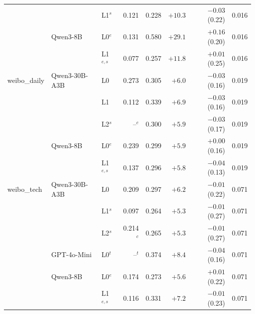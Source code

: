 \begin{table}[t]
\begin{tabular}{lllrrrrr}
 &  & L1$^{s}$ & 0.121 & 0.228 & $+10.3$ & $-0.03$ (0.22) & 0.016 \\
 & Qwen3-8B & L0$^{e}$ & 0.131 & 0.580 & $+29.1$ & $+0.16$ (0.20) & 0.016 \\
 &  & L1$^{e,s}$ & 0.077 & 0.257 & $+11.8$ & $+0.01$ (0.25) & 0.016 \\
weibo\_daily & Qwen3-30B-A3B & L0 & 0.273 & 0.305 & $+6.0$ & $-0.03$ (0.16) & 0.019 \\
 &  & L1 & 0.112 & 0.339 & $+6.9$ & $-0.03$ (0.16) & 0.019 \\
 &  & L2$^{s}$ & --$^{c}$ & 0.300 & $+5.9$ & $-0.03$ (0.17) & 0.019 \\
 & Qwen3-8B & L0$^{e}$ & 0.239 & 0.299 & $+5.9$ & $+0.00$ (0.16) & 0.019 \\
 &  & L1$^{e,s}$ & 0.137 & 0.296 & $+5.8$ & $-0.04$ (0.13) & 0.019 \\
weibo\_tech & Qwen3-30B-A3B & L0 & 0.209 & 0.297 & $+6.2$ & $-0.01$ (0.22) & 0.071 \\
 &  & L1$^{s}$ & 0.097 & 0.264 & $+5.3$ & $-0.01$ (0.27) & 0.071 \\
 &  & L2$^{s}$ & 0.214$^{c}$ & 0.265 & $+5.3$ & $-0.01$ (0.27) & 0.071 \\
 & GPT-4o-Mini & L0$^{t}$ & --$^{t}$ & 0.374 & $+8.4$ & $-0.04$ (0.16) & 0.071 \\
 & Qwen3-8B & L0$^{e}$ & 0.174 & 0.273 & $+5.6$ & $+0.01$ (0.22) & 0.071 \\
 &  & L1$^{e,s}$ & 0.116 & 0.331 & $+7.2$ & $-0.01$ (0.23) & 0.071 \\
\bottomrule
\end{tabular}
\end{table}
